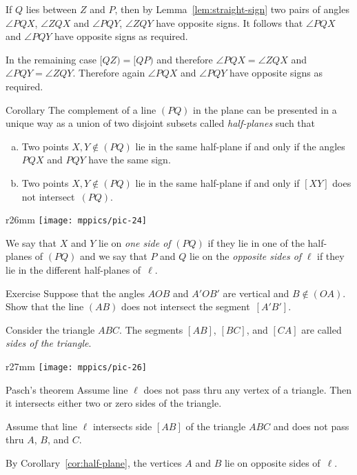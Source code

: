 If $Q$ lies between $Z$ and $P$, then by Lemma~\ref{lem:straight-sign} two pairs of angles $\angle PQX$, $\angle ZQX$ and $\angle PQY$, $\angle ZQY$ have opposite signs. 
It follows that $\angle PQX$ and $\angle PQY$ have opposite signs as required.

In the remaining case $[QZ)=[QP)$ and therefore $\angle PQX=\angle ZQX$ and $\angle PQY=\angle ZQY$. 
Therefore again $\angle PQX$ and $\angle PQY$ have opposite signs as required.
\qeds

\begin{thm}[\abs]{Corollary}\label{cor:half-plane}
The complement of a line $(PQ)$ in the plane 
can be presented in a unique way as a union of two disjoint subsets 
called \emph{half-planes}
such that 
\begin{enumerate}[(a)]
\item\label{cor:half-plane:angle} Two points $X,Y\notin(PQ)$ lie in the same half-plane if and only if the angles $PQX$ and $PQY$ have the same sign.
\item\label{cor:half-plane:intersect} Two points $X,Y\notin(PQ)$ lie in the same half-plane if and only if $[XY]$ does not intersect~$(PQ)$.
\end{enumerate}

\end{thm}

{

\begin{wrapfigure}{r}{26mm}
\vskip-4mm
\centering
\texttt{[image: mppics/pic-24]}
\end{wrapfigure}

We say that $X$ and $Y$ lie on  {}\emph{one side of} $(PQ)$ if they lie in one of the half-planes of $(PQ)$ and we say that  $P$ and $Q$ lie on the {}\emph{opposite sides of} $\ell$ if they lie in the different half-planes of~$\ell$.


\begin{thm}{Exercise}\label{ex:vert-intersect}
Suppose that the angles $AOB$ and $A'OB'$ are vertical and $B\notin (OA)$.
Show that the line $(AB)$ does not intersect the segment~$[A'B']$.
\end{thm}

}

Consider the triangle $ABC$.
The segments $[AB]$, $[BC]$, and $[CA]$ are called 
\emph{sides of the triangle}.

{

\begin{wrapfigure}{r}{27mm}
\vskip-4mm
\centering
\texttt{[image: mppics/pic-26]}
\end{wrapfigure}

\begin{thm}[\abs]{Pasch's theorem}\label{thm:pasch}
Assume line $\ell$ does not pass thru any vertex of a triangle.
Then it intersects either two or zero sides of the triangle.
\end{thm}

Assume that line $\ell$ intersects side $[AB]$ of the triangle $ABC$ and does not pass thru $A$, $B$, and $C$.

By Corollary~\ref{cor:half-plane}, the vertices $A$ and $B$ lie on opposite sides of~$\ell$.

}

